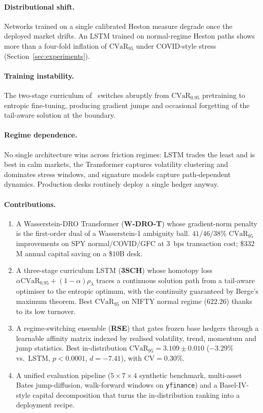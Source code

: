 \documentclass[11pt]{article}
\newcommand{\cvar}{\mathrm{CVaR}}
\begin{document}
\paragraph{Distributional shift.}  Networks trained on a single calibrated Heston measure degrade once the deployed market drifts.  An LSTM trained on normal-regime Heston paths shows more than a four-fold inflation of $\cvar_{95}$ under COVID-style stress (Section~\ref{sec:experiments}).

\paragraph{Training instability.}  The two-stage curriculum of~\citet{kozyra2019deep} switches abruptly from $\cvar_{0.95}$ pretraining to entropic fine-tuning, producing gradient jumps and occasional forgetting of the tail-aware solution at the boundary.

\paragraph{Regime dependence.}  No single architecture wins across friction regimes: LSTM trades the least and is best in calm markets, the Transformer captures volatility clustering and dominates stress windows, and signature models capture path-dependent dynamics.  Production desks routinely deploy a single hedger anyway.

\paragraph{Contributions.}
\begin{enumerate}[leftmargin=*]
\item A Wasserstein-DRO Transformer (\textbf{W-DRO-T}) whose gradient-norm penalty is the first-order dual of a Wasserstein-1 ambiguity ball.  $41/46/38\%$ $\cvar_{95}$ improvements on SPY normal/COVID/GFC at $3$~bps transaction cost; \$$332$M annual capital saving on a \$$10$B desk.
\item A three-stage curriculum LSTM (\textbf{3SCH}) whose homotopy loss $\alpha\cvar_{0.95}+(1-\alpha)\rho_\lambda$ traces a continuous solution path from a tail-aware optimiser to the entropic optimum, with the continuity guaranteed by Berge's maximum theorem.  Best $\cvar_{95}$ on NIFTY normal regime ($622.26$) thanks to its low turnover.
\item A regime-switching ensemble (\textbf{RSE}) that gates frozen base hedgers through a learnable affinity matrix indexed by realised volatility, trend, momentum and jump statistics.  Best in-distribution $\cvar_{95}=3.109\pm 0.010$ ($-3.29\%$ vs.\ LSTM, $p<0.0001$, $d=-7.41$), with $\mathrm{CV}=0.30\%$.
\item A unified evaluation pipeline ($5{\times}7{\times}4$ synthetic benchmark, multi-asset Bates jump-diffusion, walk-forward windows on \texttt{yfinance}) and a Basel-IV-style capital decomposition that turns the in-distribution ranking into a deployment recipe.
\end{enumerate}
\end{document}
